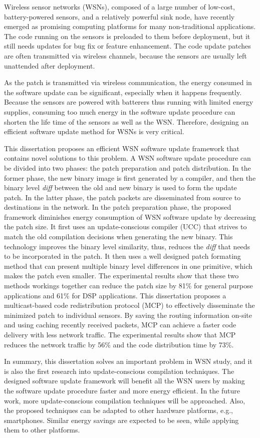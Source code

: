 Wireless sensor networks (WSNs), composed of a large number of low-cost, battery-powered sensors, and a relatively 
powerful sink node, have recently emerged as promising computing platforms for many non-traditional applications. 
The code running on the sensors is preloaded to them before deployment, but it still needs updates for 
bug fix or feature enhancement. The code update patches are often 
transmitted via wireless channels, because the sensors are usually left unattended after deployment. 

As the patch is 
transmitted via wireless communication, the energy consumed in the software update can be significant, 
especially when it happens frequently.
Because the sensors are powered with batterers thus running with limited energy supplies,
consuming too much energy in the software update procedure can shorten the life time of the sensors as well as the
WSN. Therefore, designing an efficient software update method for WSNs is very critical.

This dissertation proposes an efficient WSN software update framework that contains novel solutions to this problem.
A WSN software update procedure can be divided into two phases: the patch preparation and patch distribution.
In the former phase, the new binary image is first generated by a compiler, and then the binary
level {\it diff} between the old and new binary is used to form the update patch. 
In the latter phase, the patch packets are disseminated from source to destinations in the network. 
In the patch preparation phase, the proposed framework diminishes energy consumption of WSN software update by 
decreasing the patch size.
It first uses an update-conscious compiler (UCC) that strives to match the old
compilation decisions when generating the new binary. This technology improves the binary level similarity, thus, reduces
the {\it diff} that needs to be incorporated in the patch.
It then uses a well designed patch formating method that can present multiple 
binary level differences in one primitive, which makes the patch even smaller.
The experimental results show that these two methods workings together can 
reduce the patch size by 81\% for general purpose applications and 61\% for DSP applications.
This dissertation proposes a multicast-based code redistribution protocol (MCP) to 
effectively disseminate the minimized patch to individual sensors.
By saving the routing information on-site and using caching recently received packets, 
MCP can achieve a faster code delivery with less network traffic.
The experimental results show that MCP reduces the network traffic by 56\% and the code distribution time by 73\%.

In summary, this dissertation solves an important problem in WSN study, and it is also the first 
research into update-conscious compilation techniques. 
The designed software update framework will benefit all the WSN 
users by making the software update procedure faster and more energy efficient. 
In the future work, more update-conscious compilation techniques will be approached. 
Also, the proposed techniques can be adapted to other hardware platforms, e.g., smartphones.
Similar energy savings are expected to be seen, while applying them to other platforms.

